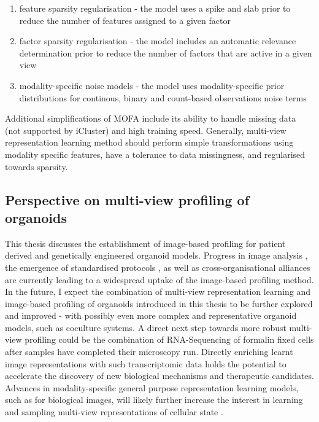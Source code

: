 \begin{flushleft}
\begin{enumerate}
    \item feature sparsity regularisation - the model uses a spike and slab prior to reduce the number of features assigned to a given factor
    \item factor sparsity regularisation - the model includes an automatic relevance determination prior to reduce the number of factors that are active in a given view
    \item modality-specific noise models -  the model uses modality-specific prior distributions for continous, binary and count-based observations noise terms 
\end{enumerate}

Additional simplifications of MOFA include its ability to handle missing data (not supported by iCluster) and high training speed. Generally, multi-view representation learning method should perform simple transformations using modality specific features, have a tolerance to data missingness, and regularised towards sparsity. 
\bigbreak

\subsection{Perspective on multi-view profiling of organoids}
This thesis discusses the establishment of image-based profiling for patient derived and genetically engineered organoid models. Progress in image analysis \citep{chandrasekaranImagebasedProfilingDrug2021a}, the emergence of standardised protocols \citep{Bray2016-ue}, as well as cross-organisational alliances \citep{chandrasekaranJUMPCellPainting2023} are currently leading to a widespread uptake of the image-based profiling method. In the future, I expect the combination of multi-view representation learning and image-based profiling of organoids introduced in this thesis to be further explored and improved - with possibly even more complex and representative organoid models, such as coculture systems. A direct next step towards more robust multi-view profiling could be the combination of RNA-Sequencing of formalin fixed cells after samples have completed their microscopy run. Directly enriching learnt image representations with such transcriptomic data holds the potential to accelerate the discovery of new biological mechanisms and therapeutic candidates. Advances in modality-specific general purpose representation learning models, such as for biological images, will likely further increase the interest in learning and sampling multi-view representations of cellular state \citep{pfaendlerSelfsupervisedVisionTransformers2023}.




\end{flushleft}
